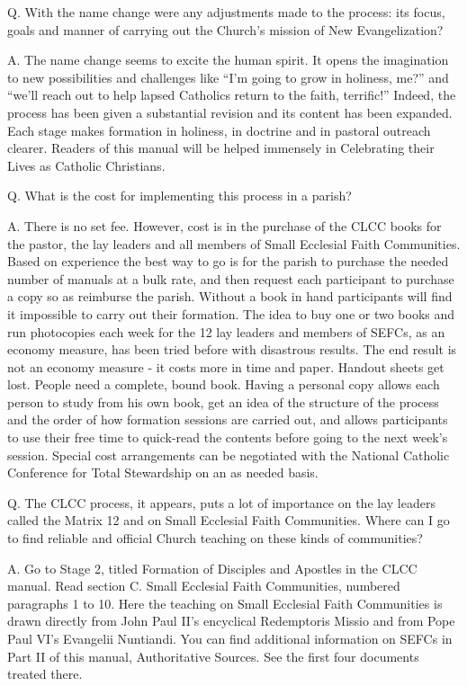 \documentclass[oneside]{book}
\begin{document}
Q. With the name change were any adjustments made to the process: its focus,
goals and manner of carrying out the Church's mission of New Evangelization?

A. The name change seems to excite the human spirit. It opens the imagination to
new possibilities and challenges like ``I'm going to grow in holiness, me?'' and
``we'll reach out to help lapsed Catholics return to the faith, terrific!''
Indeed, the process has been given a substantial revision and its content has
been expanded. Each stage makes formation in holiness, in doctrine and in
pastoral outreach clearer. Readers of this manual will be helped immensely in
Celebrating their Lives as Catholic Christians.

Q. What is the cost for implementing this process in a parish?

A. There is no set fee. However, cost is in the purchase of the CLCC books for
the pastor, the lay leaders and all members of Small Ecclesial Faith
Communities. Based on experience the best way to go is for the parish to
purchase the needed number of manuals at a bulk rate, and then request each
participant to purchase a copy so as reimburse the parish. Without a book in
hand participants will find it impossible to carry out their formation. The idea
to buy one or two books and run photocopies each week for the 12 lay leaders and
members of SEFCs, as an economy measure, has been tried before with disastrous
results. The end result is not an economy measure - it costs more in time and
paper. Handout sheets get lost. People need a complete, bound book.
Having a personal copy allows each person to study from his own book, get an
idea of the structure of the process and the order of how formation sessions are
carried out, and allows participants to use their free time to quick-read the
contents before going to the next week's session.
Special cost arrangements can be negotiated with the National Catholic
Conference for Total Stewardship on an as needed basis.

Q. The CLCC process, it appears, puts a lot of importance on the lay leaders
called the Matrix 12 and on Small Ecclesial Faith Communities. Where can I go to
find reliable and official Church teaching on these kinds of communities?

A. Go to Stage 2, titled Formation of Disciples and Apostles in the CLCC
manual. Read section C. Small Ecclesial Faith Communities, numbered paragraphs 1
to 10. Here the teaching on Small Ecclesial Faith Communities is drawn directly
from John Paul II's encyclical Redemptoris Missio and from Pope Paul VI's
Evangelii Nuntiandi. You can find additional information on SEFCs in Part II of
this manual, Authoritative Sources. See the first four documents treated there.
\end{document}
